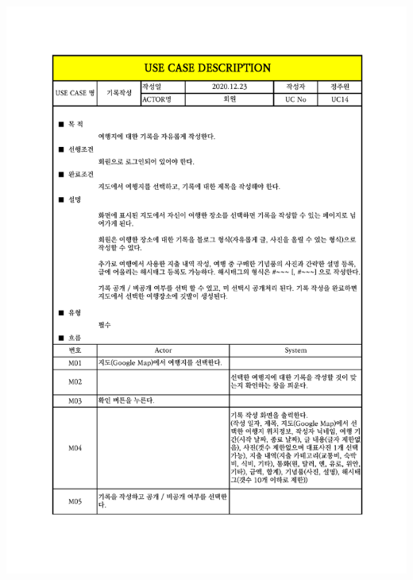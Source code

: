 {{{{{{{{{{{{{{{\includegraphics[width=1.1\textwidth]{./Figure/Design/Display/usecase/014-1.pdf} \\
}}}}}}}}}}}}}}}
